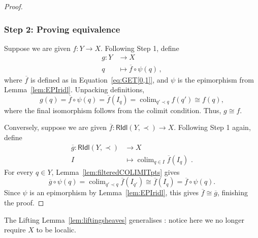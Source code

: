 \documentclass[a4paper, 11pt,reqno]{amsart}
\newcommand{\MING}[1]{{\color{blue} {\tiny \bf (M:)} {\bf #1}}}
\newcommand{\RIdl}{\mathsf{RIdl}}
\DeclareMathOperator*{\colim}{colim}
\begin{document}
\begin{proof}

	\subsubsection*{Step 2: Proving equivalence} Suppose we are given $f\colon Y\rightarrow X$. Following Step 1, define
	\begin{align*}
	g\colon Y &\longrightarrow X\\
	q&\longmapsto \overline{f}\circ\psi(q)\,,
	\end{align*}
	where $\overline{f}$ is defined as in Equation~\eqref{eq:GET[0,1]}, and $\psi$ is the epimorphism from Lemma~\ref{lem:EPIridl}. Unpacking definitions, \[g(q)=\overline{f}\circ \psi(q)= \overline{f}(I_q)=\displaystyle\colim_{q'\prec q}f(q')\cong f(q),\]
	where the final isomorphism follows from the colimit condition. Thus, $g\cong f$.
	
	Conversely, suppose we are given $\overline{f}\colon\RIdl(Y,\prec)\rightarrow X$. Following Step 1 again, define 
	\begin{align*}
	\overline{g}\colon\RIdl(Y,\prec)&\longrightarrow X\\
	I&\longmapsto \colim_{q\in I}\overline{f}(I_q)\,\,.
	\end{align*}
	For every $q\in Y$, Lemma~\ref{lem:filteredCOLIMITpts} gives
	$$
	\overline g\circ \psi(q)
	=
	\colim_{q'\prec q}\overline f(I_{q'})
	\cong
	\overline f(I_q)
	=
	\overline f\circ \psi(q).
	$$
Since $\psi$ is an epimorphism by Lemma~\ref{lem:EPIridl}, this gives $\overline{f}\cong \overline{g}$, finishing the proof.\end{proof}

\begin{remark} The Lifting Lemma~\ref{lem:liftingsheaves} generalises \cite[Lemma 1.29]{NV}: notice here we no longer require $X$ to be localic. %
\end{remark}
\end{document}
